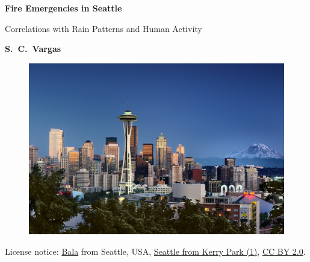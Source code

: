 \documentclass[12pt,a4paper]{article}
\date{}
\begin{document}
\thispagestyle{empty}

\begin{center}

\textsf{}

\vskip 1.2cm

{\LARGE \bf Fire Emergencies in Seattle}

\vskip 0.1cm

{\Large Correlations with Rain Patterns and Human Activity}
 

\vskip 0.75cm

{\bf \large S.~C.~Vargas}



\end{center}

\vskip 1cm


\begin{figure}[ht!]
\centering
\includegraphics[scale=0.5]{Seattle_Pic.jpg}
\label{pic}
\end{figure}
\vspace{-0.8cm}
\begin{center}
{\small License notice: \href{https://www.flickr.com/people/43518209@N00}{Bala} from Seattle, USA, \href{https://commons.wikimedia.org/wiki/File:Seattle_from_Kerry_Park_(1).jpg}{Seattle from Kerry Park (1)}, \href{https://creativecommons.org/licenses/by/2.0/legalcode}{CC BY 2.0}.}
\end{center}
\end{document}
